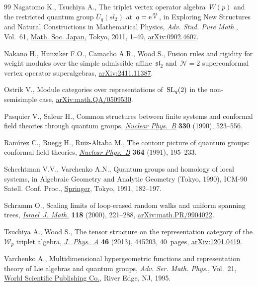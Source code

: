 \documentclass[pdftex]{sigma}
\numberwithin{equation}{section}
\begin{document}
\begin{thebibliography}{99}
Nagatomo K., Tsuchiya A., The triplet vertex operator algebra~{$W(p)$} and the
 restricted quantum group {$\overline U_q(sl_2)$} at~{$q={\rm e}^{\frac{\pi
 i}{p}}$}, in Exploring {N}ew {S}tructures and {N}atural {C}onstructions in
 {M}athematical {P}hysics, \textit{Adv. Stud. Pure Math.}, Vol.~61,
 \href{https://doi.org/10.2969/aspm/06110001}{Math. Soc. Japan}, Tokyo, 2011,
 1--49, \href{http://arxiv.org/abs/0902.4607}{arXiv:0902.4607}.

Nakano H., Hunziker F.O., Camacho A.R., Wood S., Fusion rules and rigidity for
 weight modules over the simple admissible affine~$\mathfrak{sl}_{2}$
 and~${\mathcal{N}=2}$ superconformal vertex operator superalgebras,
 \href{http://arxiv.org/abs/2411.11387}{arXiv:2411.11387}.

Ostrik V., Module categories over representations of~${{\rm SL}_q (2)}$ in the
 non-semisimple case,
 \href{http://arxiv.org/abs/math.QA/0509530}{arXiv:math.QA/0509530}.

Pasquier V., Saleur H., Common structures between finite systems and conformal
 field theories through quantum groups,
 \href{https://doi.org/10.1016/0550-3213(90)90122-T}{\textit{Nuclear Phys.~B}}
 \textbf{330} (1990), 523--556.

Ram\'{\i}rez C., Ruegg H., Ruiz-Altaba M., The contour picture of quantum
 groups: conformal field theories,
 \href{https://doi.org/10.1016/0550-3213(91)90583-J}{\textit{Nuclear Phys.~B}}
 \textbf{364} (1991), 195--233.

Schechtman V.V., Varchenko A.N., Quantum groups and homology of local systems,
 in Algebraic {G}eometry and {A}nalytic {G}eometry ({T}okyo, 1990), ICM-90
 Satell. Conf. Proc.,
 \href{https://doi.org/10.1007/978-4-431-68172-4_10}{Springer}, Tokyo, 1991,
 182--197.

Schramm O., Scaling limits of loop-erased random walks and uniform spanning
 trees, \href{https://doi.org/10.1007/BF02803524}{\textit{Israel~J. Math.}}
 \textbf{118} (2000), 221--288,
 \href{http://arxiv.org/abs/math.PR/9904022}{arXiv:math.PR/9904022}.

Tsuchiya A., Wood S., The tensor structure on the representation category of
 the {$\mathcal{W}_p$} triplet algebra,
 \href{https://doi.org/10.1088/1751-8113/46/44/445203}{\textit{J.~Phys.~A}}
 \textbf{46} (2013), 445203, 40~pages,
 \href{http://arxiv.org/abs/1201.0419}{arXiv:1201.0419}.

Varchenko A., Multidimensional hypergeometric functions and representation
 theory of {L}ie algebras and quantum groups, \textit{Adv. Ser. Math. Phys.},
 Vol.~21, \href{https://doi.org/10.1142/2467}{World Scientific Publishing Co.},
 River Edge, NJ, 1995.

\end{thebibliography}\LastPageEnding
\end{document}
